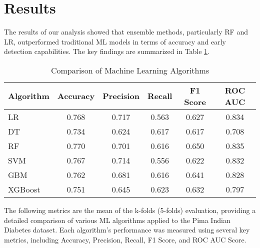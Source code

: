\section{Results}
The results of our analysis showed that ensemble methods, particularly RF and LR, outperformed traditional ML models in terms of accuracy and early detection capabilities. The key findings are summarized in Table \ref{table:comparison}.


\begin{table}[htbp]
\caption{Comparison of Machine Learning Algorithms}
\begin{center}
\small %
\setlength{\tabcolsep}{1pt} %
\begin{tabular}{|p{1.6cm}|c|c|c|c|c|}\hline
\textbf{Algorithm} & \textbf{Accuracy} & \textbf{Precision} & \textbf{Recall} & \textbf{F1 Score} & \textbf{ROC AUC} \\
\hline
LR & 0.768 & 0.717 & 0.563 & 0.627 & 0.834 \\
DT & 0.734 & 0.624 & 0.617 & 0.617 & 0.708 \\
RF & 0.770 & 0.701 & 0.616 & 0.650 & 0.835 \\
SVM & 0.767 & 0.714 & 0.556 & 0.622 & 0.832 \\
GBM & 0.762 & 0.681 & 0.616 & 0.641 & 0.828 \\
XGBoost & 0.751 & 0.645 & 0.623 & 0.632 & 0.797 \\
\hline
\end{tabular}
\label{table:comparison}
\end{center}
\end{table}

The following metrics are the mean of the k-folds (5-folds) evaluation, providing a detailed comparison of various ML algorithms applied to the Pima Indian Diabetes dataset. Each algorithm's performance was measured using several key metrics, including Accuracy, Precision, Recall, F1 Score, and ROC AUC Score.

